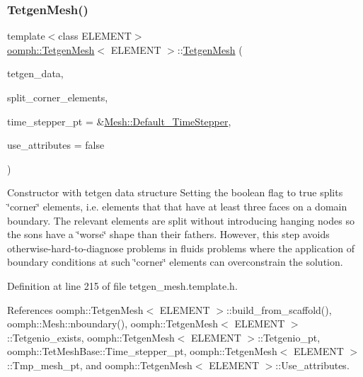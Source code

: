 \mbox{\label{classoomph_1_1TetgenMesh_a0fa783641ea515a942941425c468df01}} 
\subsubsection{\texorpdfstring{Tetgen\+Mesh()}{TetgenMesh()}\hspace{0.1cm}{\footnotesize\ttfamily [5/6]}}
{\footnotesize\ttfamily template$<$class E\+L\+E\+M\+E\+NT$>$ \\
\hyperlink{classoomph_1_1TetgenMesh}{oomph\+::\+Tetgen\+Mesh}$<$ E\+L\+E\+M\+E\+NT $>$\+::\hyperlink{classoomph_1_1TetgenMesh}{Tetgen\+Mesh} (\begin{DoxyParamCaption}\item[{tetgenio \&}]{tetgen\+\_\+data,  }\item[{const bool \&}]{split\+\_\+corner\+\_\+elements,  }\item[{\hyperlink{classoomph_1_1TimeStepper}{Time\+Stepper} $\ast$}]{time\+\_\+stepper\+\_\+pt = {\ttfamily \&\hyperlink{classoomph_1_1Mesh_a12243d0fee2b1fcee729ee5a4777ea10}{Mesh\+::\+Default\+\_\+\+Time\+Stepper}},  }\item[{const bool \&}]{use\+\_\+attributes = {\ttfamily false} }\end{DoxyParamCaption})\hspace{0.3cm}{\ttfamily [inline]}}



Constructor with tetgen data structure Setting the boolean flag to true splits \char`\"{}corner\char`\"{} elements, i.\+e. elements that that have at least three faces on a domain boundary. The relevant elements are split without introducing hanging nodes so the sons have a \char`\"{}worse\char`\"{} shape than their fathers. However, this step avoids otherwise-\/hard-\/to-\/diagnose problems in fluids problems where the application of boundary conditions at such \char`\"{}corner\char`\"{} elements can overconstrain the solution. 



Definition at line 215 of file tetgen\+\_\+mesh.\+template.\+h.



References oomph\+::\+Tetgen\+Mesh$<$ E\+L\+E\+M\+E\+N\+T $>$\+::build\+\_\+from\+\_\+scaffold(), oomph\+::\+Mesh\+::nboundary(), oomph\+::\+Tetgen\+Mesh$<$ E\+L\+E\+M\+E\+N\+T $>$\+::\+Tetgenio\+\_\+exists, oomph\+::\+Tetgen\+Mesh$<$ E\+L\+E\+M\+E\+N\+T $>$\+::\+Tetgenio\+\_\+pt, oomph\+::\+Tet\+Mesh\+Base\+::\+Time\+\_\+stepper\+\_\+pt, oomph\+::\+Tetgen\+Mesh$<$ E\+L\+E\+M\+E\+N\+T $>$\+::\+Tmp\+\_\+mesh\+\_\+pt, and oomph\+::\+Tetgen\+Mesh$<$ E\+L\+E\+M\+E\+N\+T $>$\+::\+Use\+\_\+attributes.

